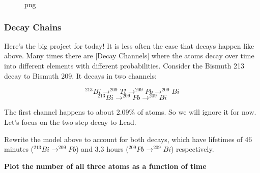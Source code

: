 \begin{figure}
\centering
{}
\caption{png}
\end{figure}

\subsubsection{Decay Chains}\label{decay-chains}

Here's the big project for today! It is less often the case that decays
happen like above. Many times there are {[}Decay Channels{]} where the
atoms decay over time into different elements with different
probabilities. Consider the Bismuth 213 decay to Bismuth 209. It decays
in two channels:

\[^{213}Bi \rightarrow  ^{209}Tl \rightarrow  ^{209}Pb \rightarrow  ^{209}Bi\]
\[^{213}Bi \rightarrow  ^{209}Pb \rightarrow  ^{209}Bi\]

The first channel happens to about 2.09\% of atoms. So we will ignore it
for now. Let's focus on the two step decay to Lead.

Rewrite the model above to account for both decays, which have lifetimes
of 46 minutes (\(^{213}Bi \rightarrow ^{209}Pb\)) and 3.3 hours
(\(^{209}Pb \rightarrow  ^{209}Bi\)) respectively.

\textbf{Plot the number of all three atoms as a function of time}

\begin{Shaded}
\begin{Highlighting}[]
\end{Highlighting}
\end{Shaded}

